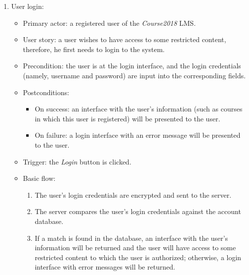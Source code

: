 \begin{enumerate}
\item User login:
\begin{itemize}
\item Primary actor:
    a registered user of the \emph{Course2018} LMS.
\item User story:
    a user wishes to have access to some restricted content, therefore, he
    first needs to login to the system.
\item Precondition:
    the user is at the login interface, and the login credentials
    (namely, username and password) are input into the corresponding fields.
\item Postconditions:
    \begin{itemize}
        \item On success: an interface with the user's information (such as courses
            in which this user is registered) will be presented to the user.
        \item On failure: a login interface with an error message will be
            presented to the user.
    \end{itemize}
\item Trigger: the \emph{Login} button is clicked.
\item Basic flow:
    \begin{enumerate}
        \item The user's login credentials are encrypted and sent to the
            server.
        \item The server compares the user's login credentials against the
            account database.
        \item If a match is found in the database, an interface with the user's
            information will be returned and the user will have access to
            some restricted content to which the user is authorized; otherwise,
            a login interface with error messages will be returned.
    \end{enumerate}
\end{itemize}


\end{enumerate}

